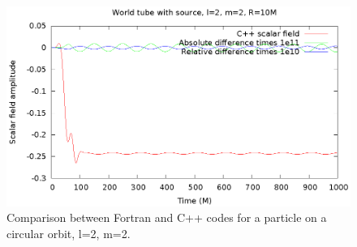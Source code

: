 \begin{figure}
  \includegraphics{wtcircl2m2}
  \caption{Comparison between Fortran and C++ codes for a particle on a circular orbit, l=2, m=2.}
  \label{circ4}
\end{figure}
